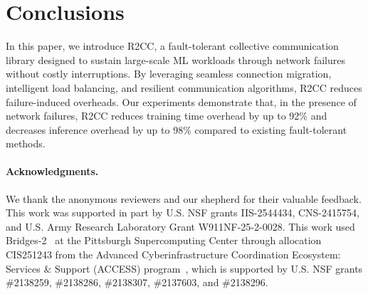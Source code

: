 \section{Conclusions}

In this paper, we introduce R2CC, a fault-tolerant collective communication library designed to sustain large-scale ML workloads through network failures without costly interruptions. By leveraging seamless connection migration, intelligent load balancing, and resilient communication algorithms, R2CC reduces failure-induced overheads.
Our experiments demonstrate that, in the presence of network failures, R2CC reduces training time overhead by up to 92\% and decreases inference overhead by up to 98\% compared to existing fault-tolerant methods.

\paragraph{Acknowledgments.} We thank the anonymous reviewers and our shepherd for their valuable feedback.
This work was supported in part by U.S. NSF grants IIS-2544434, CNS-2415754, and U.S. Army Research Laboratory Grant W911NF-25-2-0028.
This work used Bridges-2~\cite{brown2021bridges} at the Pittsburgh Supercomputing Center through allocation CIS251243 from the Advanced Cyberinfrastructure Coordination Ecosystem: Services \& Support (ACCESS) program~\cite{boerner2023access}, which is supported by U.S. NSF grants \#2138259, \#2138286, \#2138307, \#2137603, and \#2138296.
